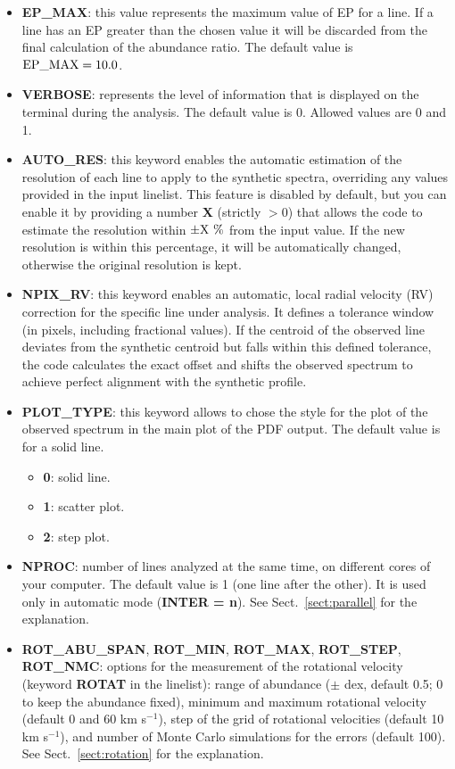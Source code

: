 \documentclass[modern]{aastex701}
\begin{document}
\begin{itemize}
    \item {\bf EP\_MAX}: this value represents the maximum value of EP for a line. If a line has an EP greater than the chosen value it will be discarded from the final calculation of the abundance ratio. The default value is $\rm EP\_MAX = 10.0$.
    \item {\bf VERBOSE}: represents the level of information that is displayed on the terminal during the analysis. The default value is 0. Allowed values are 0 and 1.
    \item {\bf AUTO\_RES}: this keyword enables the automatic estimation of the resolution of each line to apply to the synthetic spectra, overriding any values provided in the input linelist. This feature is disabled by default, but you can enable it by providing a number {\bf X} (strictly $> 0$) that allows the code to estimate the resolution within {\bf $\rm\pm X~\%$} from the input value. If the new resolution is within this percentage, it will be automatically changed, otherwise the original resolution is kept.
    \item {\bf NPIX\_RV}: this keyword enables an automatic, local radial velocity (RV) correction for the specific line under analysis. It defines a tolerance window (in pixels, including fractional values). If the centroid of the observed line deviates from the synthetic centroid but falls within this defined tolerance, the code calculates the exact offset and shifts the observed spectrum to achieve perfect alignment with the synthetic profile.
    \item {\bf PLOT\_TYPE}: this keyword allows to chose the style for the plot of the observed spectrum in the main plot of the PDF output. The default value is for a solid line.
    \begin{itemize}
        \item {\bf 0}: solid line.
        \item {\bf 1}: scatter plot.
        \item {\bf 2}: step plot.
    \end{itemize}
    \item {\bf NPROC}: number of lines analyzed at the same time, on different cores of your computer. The default value is 1 (one line after the other). It is used only in automatic mode ({\bf INTER = n}). See Sect.~\ref{sect:parallel} for the explanation.
    \item {\bf ROT\_ABU\_SPAN}, {\bf ROT\_MIN}, {\bf ROT\_MAX}, {\bf ROT\_STEP}, {\bf ROT\_NMC}: options for the measurement of the rotational velocity (keyword {\bf ROTAT} in the linelist): range of abundance ($\pm$ dex, default 0.5; 0 to keep the abundance fixed), minimum and maximum rotational velocity (default 0 and 60 km s$^{-1}$), step of the grid of rotational velocities (default 10 km s$^{-1}$), and number of Monte Carlo simulations for the errors (default 100). See Sect.~\ref{sect:rotation} for the explanation. 

\end{itemize}
\end{document}
